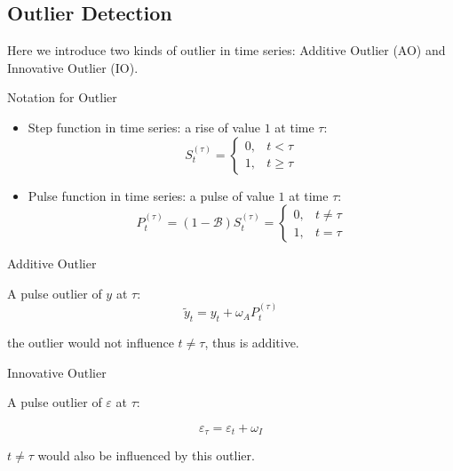     

\subsection{Outlier Detection}
    Here we introduce two kinds of outlier in time series: Additive Outlier (AO) and Innovative Outlier (IO).
    
\begin{point}
    Notation for Outlier
\end{point}

\begin{itemize}[topsep=2pt,itemsep=0pt]
    \item Step function in time series: a rise of value $ 1 $ at time $ \tau $:
    \[
         S_t^{(\tau)}=\begin{cases}
             0,& t<\tau\\
             1,& t\geq \tau
         \end{cases}
    \]
    \item Pulse function in time series: a pulse of value $ 1 $ at time $ \tau $:
    \[
        P_t^{(\tau)}=(1-\mathscr{B} ) S_t^{(\tau)}=\begin{cases}
            0,&t\neq \tau\\
            1,&t=\tau
        \end{cases}
    \]

    
\end{itemize}

    

\begin{point}
    Additive Outlier
\end{point}

    A pulse outlier of $ y $ at $ \tau $:
    \[
        \tilde{y}_t=y_t+\omega _A P_t^{(\tau)} 
    \]

    the outlier would not influence $ t\neq \tau $, thus is additive.

\begin{point}
    Innovative Outlier
\end{point}

    A pulse outlier of $ \varepsilon  $ at $ \tau $:
    
    \[
        \varepsilon _\tau =\varepsilon _t+\omega _I 
    \]

    $ t\neq \tau $ would also be influenced by this outlier.
    
    
    

